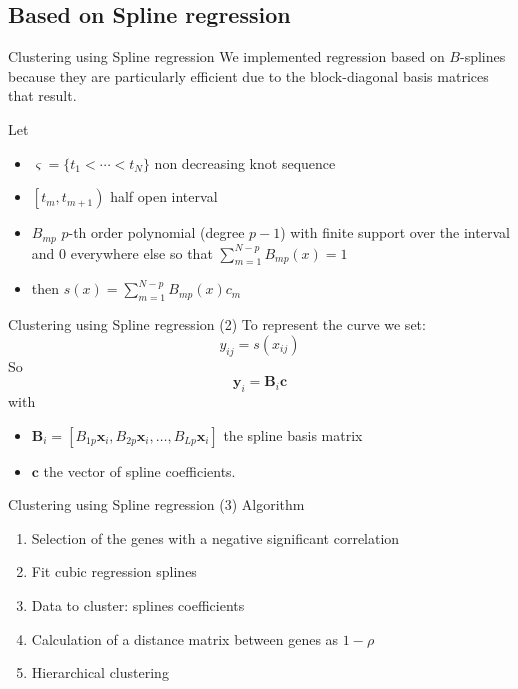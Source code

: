 \documentclass[handout]{beamer}
\begin{document}
\subsection{Based on Spline regression}


\begin{frame}{Clustering using Spline regression }
We implemented regression based on  $B$-splines because they are particularly efficient due to the block-diagonal basis matrices that result.

Let 
\begin {itemize}
\item $\varsigma=\lbrace t_1 < \cdots < t_N \rbrace$ non decreasing  knot sequence 
\item $\left[ t_m,t_{m+1} \right)$ half open interval
\item $B_{mp}$ $p$-th order polynomial (degree $p-1$) with finite support over the interval and 0 everywhere else so that  $\sum_{m=1}^{N-p}B_{mp}(x)=1$
\item then  $s(x)=\sum_{m=1}^{N-p}B_{mp}(x)c_m$ 
\end{itemize}
\end{frame}

\begin{frame}{Clustering using Spline regression (2)}
To represent the curve we set:
\[
y_{ij}=s(x_{ij})
\]
So
\[ 
\mathbf{y}_i=\mathbf{B}_i\mathbf{c}
\]
with
\begin {itemize}
\item $\mathbf{B}_i=\left[ B_{1p}\mathbf{x}_i,B_{2p}\mathbf{x}_i,\dots,B_{Lp}\mathbf{x}_i \right]$ the spline basis matrix
\item $\mathbf{c}$ the vector of spline coefficients.
\end{itemize}
\end{frame}

\begin{frame}{Clustering using Spline regression (3)}
Algorithm
\begin {enumerate}
\item Selection of the genes with a negative significant correlation
\item Fit cubic regression splines
\item Data to cluster: splines coefficients
\item Calculation of a distance matrix between genes as $1-\rho$
\item Hierarchical clustering 
\end{enumerate}
\end{frame}
\end{document}
